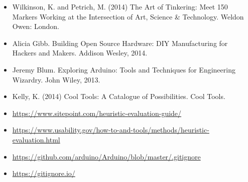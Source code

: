 \documentclass{../../fal_assignment}
\begin{document}
\begin{itemize}
     \item Wilkinson, K. and Petrich, M. (2014) The Art of Tinkering: Meet 150 Markers Working at the Intersection of Art, Science \& Technology. Weldon Owen: London.
    \item Alicia Gibb. Building Open Source Hardware: DIY Manufacturing for Hackers and Makers. Addison Wesley, 2014. 
    \item Jeremy Blum. Exploring Arduino: Tools and Techniques for Engineering Wizardry. John Wiley, 2013. 
    \item Kelly, K. (2014) Cool Tools: A Catalogue of Possibilities. Cool Tools.
    \item \url{https://www.sitepoint.com/heuristic-evaluation-guide/}
    \item \url{https://www.usability.gov/how-to-and-tools/methods/heuristic-evaluation.html}
    \item \url{https://github.com/arduino/Arduino/blob/master/.gitignore}
     \item \url{https://gitignore.io/}
\end{itemize}
\end{document}
